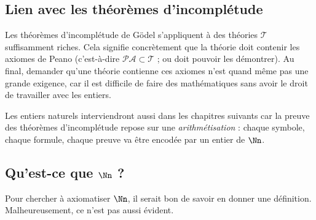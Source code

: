 \documentclass[11pt,class=report,crop=false]{standalone}
\begin{document}
\subsection{Lien avec les théorèmes d'incomplétude}

Les théorèmes d'incomplétude de Gödel s'appliquent à des théories $\mathcal{T}$ suffisamment \og{}riches\fg{}. Cela signifie concrètement que la théorie doit contenir les axiomes de Peano (c'est-à-dire $\mathcal{PA} \subset \mathcal{T}$ ; ou doit pouvoir les démontrer). Au final, demander qu'une théorie contienne ces axiomes n'est quand même pas une grande exigence, car il est difficile de faire des mathématiques sans avoir le droit de travailler avec les entiers.

Les entiers naturels interviendront aussi dans les chapitres suivants car la preuve des théorèmes d'incomplétude repose sur une \emph{arithmétisation} : chaque symbole, chaque formule, chaque preuve va être encodée par un entier de $\Nn$.

\subsection{Qu'est-ce que $\Nn$ ?}

Pour chercher à axiomatiser $\Nn$, il serait bon de savoir en donner une définition. Malheureusement, ce n'est pas aussi évident.
\end{document}

